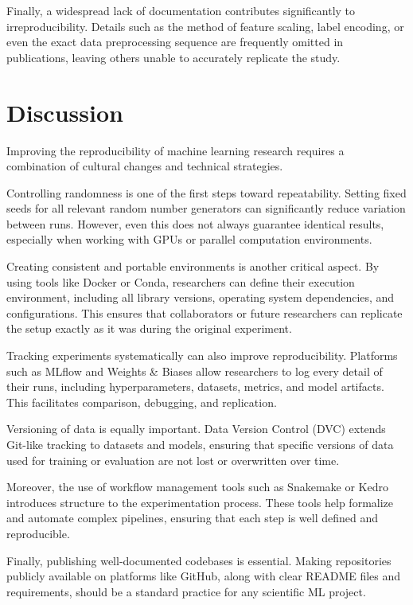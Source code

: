 \documentclass[11pt]{article}
\begin{document}
Finally, a widespread lack of documentation contributes significantly to irreproducibility. 
%
Details such as the method of feature scaling, label encoding, 
 or even the exact data preprocessing sequence are frequently omitted 
 in publications, leaving others unable to accurately replicate the study.


\section{Discussion}
\label{sec:system}
Improving the reproducibility of machine learning research requires a combination of cultural changes and technical strategies.

Controlling randomness is one of the first steps toward repeatability. Setting fixed seeds for all relevant random number generators can significantly reduce variation between runs. However, even this does not always guarantee identical results, especially when working with GPUs or parallel computation environments.

Creating consistent and portable environments is another critical aspect. By using tools like Docker or Conda, researchers can define their execution environment, including all library versions, operating system dependencies, and configurations. This ensures that collaborators or future researchers can replicate the setup exactly as it was during the original experiment.

Tracking experiments systematically can also improve reproducibility. Platforms such as MLflow and Weights \& Biases allow researchers to log every detail of their runs, including hyperparameters, datasets, metrics, and model artifacts. This facilitates comparison, debugging, and replication.

Versioning of data is equally important. Data Version Control (DVC) extends Git-like tracking to datasets and models, ensuring that specific versions of data used for training or evaluation are not lost or overwritten over time.

Moreover, the use of workflow management tools such as Snakemake or Kedro introduces structure to the experimentation process. These tools help formalize and automate complex pipelines, ensuring that each step is well defined and reproducible.

Finally, publishing well-documented codebases is essential. Making repositories publicly available on platforms like GitHub, along with clear README files and requirements, should be a standard practice for any scientific ML project.
\end{document}
